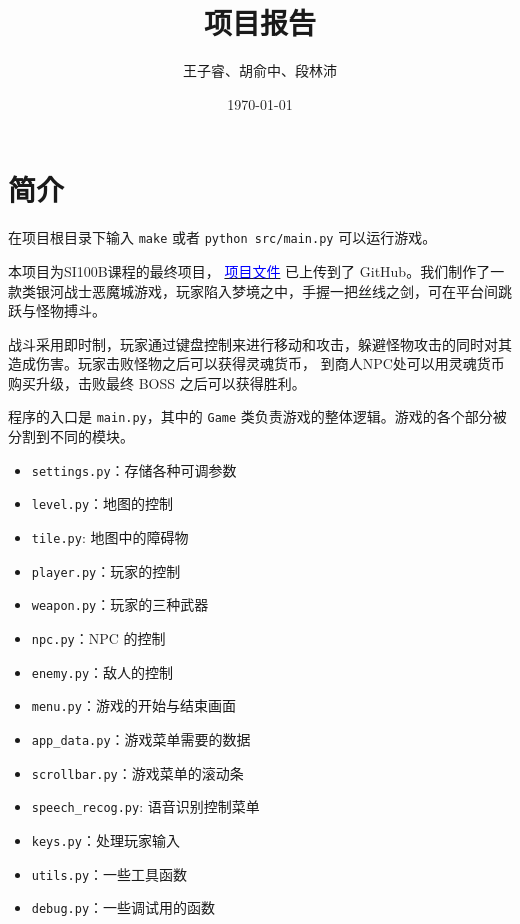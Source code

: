 \documentclass[12pt, twoside, a4paper]{article}
\newcommand{\inlinecode}[1]{\setlength{\fboxsep}{0.8mm} \colorbox{lightgray!40}{\texttt{#1}}}
\begin{document}
\title{项目报告}
\author{王子睿、胡俞中、段林沛}
\date{\today}
\maketitle

\tableofcontents

\section{简介}

在项目根目录下输入 \inlinecode{make} 或者 \inlinecode{python src/main.py} 可以运行游戏。

本项目为SI100B课程的最终项目，
\href{https://github.com/o06660o/Kono-Aozora-ni-Yakusoku-o}{\textcolor{blue}{项目文件}}
已上传到了 GitHub。我们制作了一款类银河战士恶魔城游戏，玩家陷入梦境之中，手握一把丝线之剑，可在平台间跳跃与怪物搏斗。

战斗采用即时制，玩家通过键盘控制来进行移动和攻击，躲避怪物攻击的同时对其造成伤害。玩家击败怪物之后可以获得灵魂货币，
到商人NPC处可以用灵魂货币购买升级，击败最终 BOSS 之后可以获得胜利。

程序的入口是 \inlinecode{main.py}，其中的 \inlinecode{Game} 类负责游戏的整体逻辑。游戏的各个部分被分割到不同的模块。
\begin{itemize}
    \item \inlinecode{settings.py}：存储各种可调参数
    \item \inlinecode{level.py}：地图的控制
    \item \inlinecode{tile.py}: 地图中的障碍物
    \item \inlinecode{player.py}：玩家的控制
    \item \inlinecode{weapon.py}：玩家的三种武器
    \item \inlinecode{npc.py}：NPC 的控制
    \item \inlinecode{enemy.py}：敌人的控制
    \item \inlinecode{menu.py}：游戏的开始与结束画面
    \item \inlinecode{app\_data.py}：游戏菜单需要的数据
    \item \inlinecode{scrollbar.py}：游戏菜单的滚动条
    \item \inlinecode{speech\_recog.py}: 语音识别控制菜单
    \item \inlinecode{keys.py}：处理玩家输入
    \item \inlinecode{utils.py}：一些工具函数
    \item \inlinecode{debug.py}：一些调试用的函数
\end{itemize}
\end{document}
